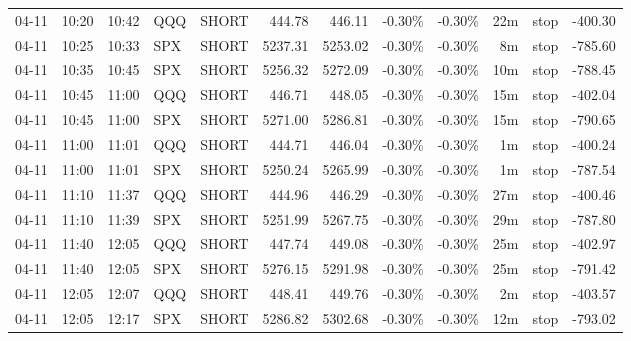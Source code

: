 \documentclass[11pt,a4paper,twoside]{article}
\begin{document}
\begin{center}
\begin{longtable}{>{\color{txtmain}}l l l l l r r r r r >{\color{txtmain}}l r}
04-11 & 10:20 & 10:42 & QQQ & SHORT & 444.78 & 446.11 & \textcolor{lossred}{-0.30\%} & \textcolor{lossred}{-0.30\%} & 22m & stop & \textcolor{lossred}{-400.30} \\
04-11 & 10:25 & 10:33 & SPX & SHORT & 5237.31 & 5253.02 & \textcolor{lossred}{-0.30\%} & \textcolor{lossred}{-0.30\%} & 8m & stop & \textcolor{lossred}{-785.60} \\
04-11 & 10:35 & 10:45 & SPX & SHORT & 5256.32 & 5272.09 & \textcolor{lossred}{-0.30\%} & \textcolor{lossred}{-0.30\%} & 10m & stop & \textcolor{lossred}{-788.45} \\
04-11 & 10:45 & 11:00 & QQQ & SHORT & 446.71 & 448.05 & \textcolor{lossred}{-0.30\%} & \textcolor{lossred}{-0.30\%} & 15m & stop & \textcolor{lossred}{-402.04} \\
04-11 & 10:45 & 11:00 & SPX & SHORT & 5271.00 & 5286.81 & \textcolor{lossred}{-0.30\%} & \textcolor{lossred}{-0.30\%} & 15m & stop & \textcolor{lossred}{-790.65} \\
04-11 & 11:00 & 11:01 & QQQ & SHORT & 444.71 & 446.04 & \textcolor{lossred}{-0.30\%} & \textcolor{lossred}{-0.30\%} & 1m & stop & \textcolor{lossred}{-400.24} \\
04-11 & 11:00 & 11:01 & SPX & SHORT & 5250.24 & 5265.99 & \textcolor{lossred}{-0.30\%} & \textcolor{lossred}{-0.30\%} & 1m & stop & \textcolor{lossred}{-787.54} \\
04-11 & 11:10 & 11:37 & QQQ & SHORT & 444.96 & 446.29 & \textcolor{lossred}{-0.30\%} & \textcolor{lossred}{-0.30\%} & 27m & stop & \textcolor{lossred}{-400.46} \\
04-11 & 11:10 & 11:39 & SPX & SHORT & 5251.99 & 5267.75 & \textcolor{lossred}{-0.30\%} & \textcolor{lossred}{-0.30\%} & 29m & stop & \textcolor{lossred}{-787.80} \\
04-11 & 11:40 & 12:05 & QQQ & SHORT & 447.74 & 449.08 & \textcolor{lossred}{-0.30\%} & \textcolor{lossred}{-0.30\%} & 25m & stop & \textcolor{lossred}{-402.97} \\
04-11 & 11:40 & 12:05 & SPX & SHORT & 5276.15 & 5291.98 & \textcolor{lossred}{-0.30\%} & \textcolor{lossred}{-0.30\%} & 25m & stop & \textcolor{lossred}{-791.42} \\
04-11 & 12:05 & 12:07 & QQQ & SHORT & 448.41 & 449.76 & \textcolor{lossred}{-0.30\%} & \textcolor{lossred}{-0.30\%} & 2m & stop & \textcolor{lossred}{-403.57} \\
04-11 & 12:05 & 12:17 & SPX & SHORT & 5286.82 & 5302.68 & \textcolor{lossred}{-0.30\%} & \textcolor{lossred}{-0.30\%} & 12m & stop & \textcolor{lossred}{-793.02} \\

\end{longtable}
\end{center}
\end{document}
